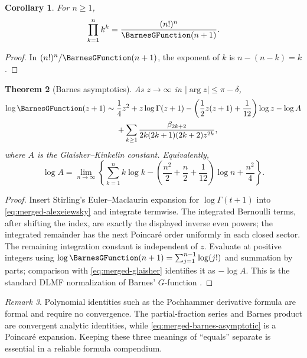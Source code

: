 \documentclass[11pt,a4paper,oneside,openany]{book}
\newtheorem{theorem}{Theorem}[chapter]
\newtheorem{corollary}[theorem]{Corollary}
\theoremstyle{definition}
\theoremstyle{remark}
\newtheorem{remark}[theorem]{Remark}
\begin{document}
\begin{corollary}
For $n\geq1$,
\begin{equation}
 \prod_{k=1}^{n}k^k=\frac{(n!)^n}{\BarnesGFunction(n+1)}.                          \label{eq:merged-hyperfactorial}
\end{equation}
\end{corollary}

\begin{proof}
In $(n!)^n/\BarnesGFunction(n+1)$, the exponent of $k$ is $n-(n-k)=k$.
\end{proof}

\begin{theorem}[Barnes asymptotics]
\label{thm:merged-barnes-asymptotic}
As $z\to\infty$ in $|\arg z|\leq\pi-\delta$,
\begin{align}
 \log \BarnesGFunction(z+1)\sim{}&\frac14z^2+z\log\Gamma(z+1)
 -\left(\frac12z(z+1)+\frac1{12}\right)\log z-\log A              \notag\\
 &+\sum_{k\geq1}\frac{\beta_{2k+2}}
 {2k(2k+1)(2k+2)z^{2k}},                                           \label{eq:merged-barnes-asymptotic}
\end{align}
where $A$ is the Glaisher--Kinkelin constant.  Equivalently,
\begin{equation}
 \log A=\lim_{n\to\infty}\left\{
 \sum_{k=1}^{n}k\log k-
 \left(\frac{n^2}{2}+\frac n2+\frac1{12}\right)\log n
 +\frac{n^2}{4}\right\}.                                         \label{eq:merged-glaisher}
\end{equation}
\end{theorem}

\begin{proof}
Insert Stirling's Euler--Maclaurin expansion for $\log\Gamma(t+1)$ into
\eqref{eq:merged-alexeiewsky} and integrate termwise.  The integrated
Bernoulli terms, after shifting the index, are exactly the displayed inverse
even powers; the integrated remainder has the next Poincaré order uniformly
in each closed sector.  The remaining integration constant is independent of
$z$.  Evaluate at positive integers using
$\log \BarnesGFunction(n+1)=\sum_{j=1}^{n-1}\log(j!)$ and summation by parts; comparison with
\eqref{eq:merged-glaisher} identifies it as $-\log A$.  This is the standard
DLMF normalization of Barnes' $G$-function \cite{NISTDLMF}.
\end{proof}

\begin{remark}
Polynomial identities such as the Pochhammer derivative formula are formal
and require no convergence.  The partial-fraction series and Barnes product
are convergent analytic identities, while
\eqref{eq:merged-barnes-asymptotic} is a Poincaré expansion.  Keeping these
three meanings of ``equals'' separate is essential in a reliable formula
compendium.
\end{remark}
\end{document}
